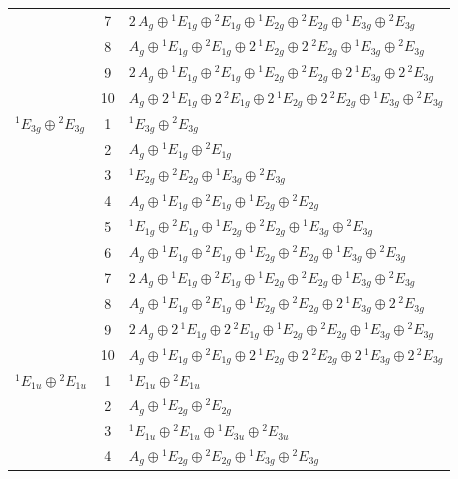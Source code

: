 \documentclass[11pt]{article}
\begin{document}
\begin{longtable}{l c p{}}
 & 7 & $2\,A_{g}\oplus {}^{1}E_{1g}\oplus {}^{2}E_{1g}\oplus {}^{1}E_{2g}\oplus {}^{2}E_{2g}\oplus {}^{1}E_{3g}\oplus {}^{2}E_{3g}$\\
 & 8 & $A_{g}\oplus {}^{1}E_{1g}\oplus {}^{2}E_{1g}\oplus 2\,{}^{1}E_{2g}\oplus 2\,{}^{2}E_{2g}\oplus {}^{1}E_{3g}\oplus {}^{2}E_{3g}$\\
 & 9 & $2\,A_{g}\oplus {}^{1}E_{1g}\oplus {}^{2}E_{1g}\oplus {}^{1}E_{2g}\oplus {}^{2}E_{2g}\oplus 2\,{}^{1}E_{3g}\oplus 2\,{}^{2}E_{3g}$\\
 & 10 & $A_{g}\oplus 2\,{}^{1}E_{1g}\oplus 2\,{}^{2}E_{1g}\oplus 2\,{}^{1}E_{2g}\oplus 2\,{}^{2}E_{2g}\oplus {}^{1}E_{3g}\oplus {}^{2}E_{3g}$\\
\hline
${}^{1}E_{3g}\oplus {}^{2}E_{3g}$ & 1 & ${}^{1}E_{3g}\oplus {}^{2}E_{3g}$\\
 & 2 & $A_{g}\oplus {}^{1}E_{1g}\oplus {}^{2}E_{1g}$\\
 & 3 & ${}^{1}E_{2g}\oplus {}^{2}E_{2g}\oplus {}^{1}E_{3g}\oplus {}^{2}E_{3g}$\\
 & 4 & $A_{g}\oplus {}^{1}E_{1g}\oplus {}^{2}E_{1g}\oplus {}^{1}E_{2g}\oplus {}^{2}E_{2g}$\\
 & 5 & ${}^{1}E_{1g}\oplus {}^{2}E_{1g}\oplus {}^{1}E_{2g}\oplus {}^{2}E_{2g}\oplus {}^{1}E_{3g}\oplus {}^{2}E_{3g}$\\
 & 6 & $A_{g}\oplus {}^{1}E_{1g}\oplus {}^{2}E_{1g}\oplus {}^{1}E_{2g}\oplus {}^{2}E_{2g}\oplus {}^{1}E_{3g}\oplus {}^{2}E_{3g}$\\
 & 7 & $2\,A_{g}\oplus {}^{1}E_{1g}\oplus {}^{2}E_{1g}\oplus {}^{1}E_{2g}\oplus {}^{2}E_{2g}\oplus {}^{1}E_{3g}\oplus {}^{2}E_{3g}$\\
 & 8 & $A_{g}\oplus {}^{1}E_{1g}\oplus {}^{2}E_{1g}\oplus {}^{1}E_{2g}\oplus {}^{2}E_{2g}\oplus 2\,{}^{1}E_{3g}\oplus 2\,{}^{2}E_{3g}$\\
 & 9 & $2\,A_{g}\oplus 2\,{}^{1}E_{1g}\oplus 2\,{}^{2}E_{1g}\oplus {}^{1}E_{2g}\oplus {}^{2}E_{2g}\oplus {}^{1}E_{3g}\oplus {}^{2}E_{3g}$\\
 & 10 & $A_{g}\oplus {}^{1}E_{1g}\oplus {}^{2}E_{1g}\oplus 2\,{}^{1}E_{2g}\oplus 2\,{}^{2}E_{2g}\oplus 2\,{}^{1}E_{3g}\oplus 2\,{}^{2}E_{3g}$\\
\hline
${}^{1}E_{1u}\oplus {}^{2}E_{1u}$ & 1 & ${}^{1}E_{1u}\oplus {}^{2}E_{1u}$\\
 & 2 & $A_{g}\oplus {}^{1}E_{2g}\oplus {}^{2}E_{2g}$\\
 & 3 & ${}^{1}E_{1u}\oplus {}^{2}E_{1u}\oplus {}^{1}E_{3u}\oplus {}^{2}E_{3u}$\\
 & 4 & $A_{g}\oplus {}^{1}E_{2g}\oplus {}^{2}E_{2g}\oplus {}^{1}E_{3g}\oplus {}^{2}E_{3g}$\\

\end{longtable}
\end{document}
